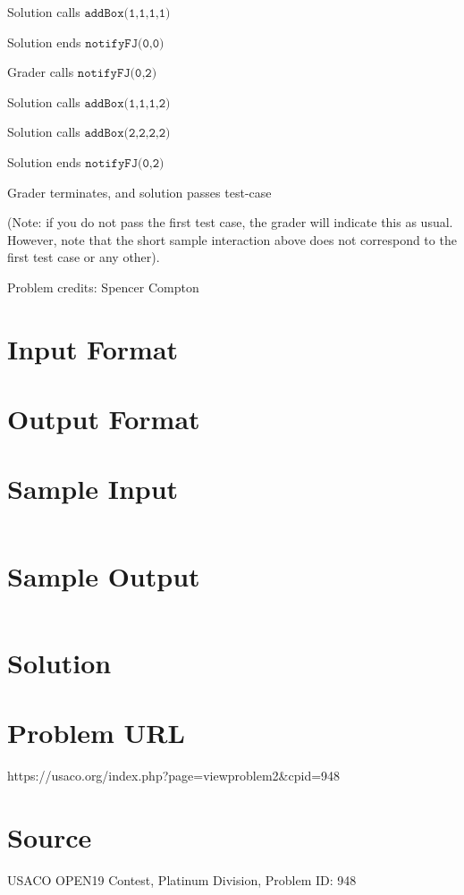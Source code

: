 \documentclass[12pt]{article}
\begin{document}
Solution calls $\texttt{addBox(1,1,1,1)}$

Solution ends $\texttt{notifyFJ(0,0)}$

Grader calls $\texttt{notifyFJ(0,2)}$

Solution calls $\texttt{addBox(1,1,1,2)}$

Solution calls $\texttt{addBox(2,2,2,2)}$

Solution ends $\texttt{notifyFJ(0,2)}$

Grader terminates, and solution passes test-case

 (Note: if you do not
pass the first test case, the grader will indicate this as usual.  However, note that the
short sample interaction above does not correspond to the first test case or any
other).

Problem credits: Spencer Compton



\section*{Input Format}


\section*{Output Format}


\section*{Sample Input}
\begin{verbatim}

\end{verbatim}

\section*{Sample Output}
\begin{verbatim}

\end{verbatim}

\section*{Solution}


\section*{Problem URL}
https://usaco.org/index.php?page=viewproblem2&cpid=948

\section*{Source}
USACO OPEN19 Contest, Platinum Division, Problem ID: 948
\end{document}
